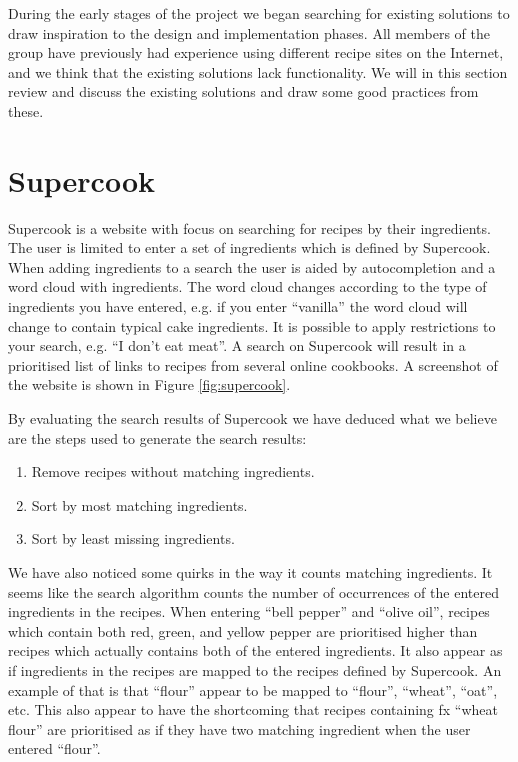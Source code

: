 During the early stages of the project we began searching for existing solutions to draw inspiration to the design and implementation phases. All members of the group have previously had experience using different recipe sites on the Internet, and we  think that the existing solutions lack functionality. We will in this section review and discuss the existing solutions and draw some good practices from these.  

\section{Supercook}
Supercook\cite{supercook} is a website with focus on searching for recipes by their ingredients. The user is limited to enter a set of ingredients which is defined by Supercook. When adding ingredients to a search the user is aided by autocompletion and a word cloud with ingredients. The word cloud changes according to the type of ingredients you have entered, e.g. if you enter ``vanilla'' the word cloud will change to contain typical cake ingredients. It is possible to apply restrictions to your search, e.g. ``I don't eat meat''. A search on Supercook will result in a prioritised list of links to recipes from several online cookbooks. A screenshot of the website is shown in Figure \ref{fig:supercook}.

By evaluating the search results of Supercook we have deduced what we believe are the steps used to generate the search results:
\begin{enumerate}
	\item Remove recipes without matching ingredients.
	\item Sort by most matching ingredients.
	\item Sort by least missing ingredients.
\end{enumerate}
We have also noticed some quirks in the way it counts matching ingredients. It seems like the search algorithm counts the number of occurrences of the entered ingredients in the recipes. When entering ``bell pepper'' and ``olive oil'', recipes which contain both red, green, and yellow pepper are prioritised higher than recipes which actually contains both of the entered ingredients. It also appear as if ingredients in the recipes are mapped to the recipes defined by Supercook. An example of that is that ``flour'' appear to be mapped to ``flour'', ``wheat'', ``oat'', etc. This also appear to have the shortcoming that recipes containing fx ``wheat flour'' are prioritised as if they have two matching ingredient when the user entered ``flour''.

